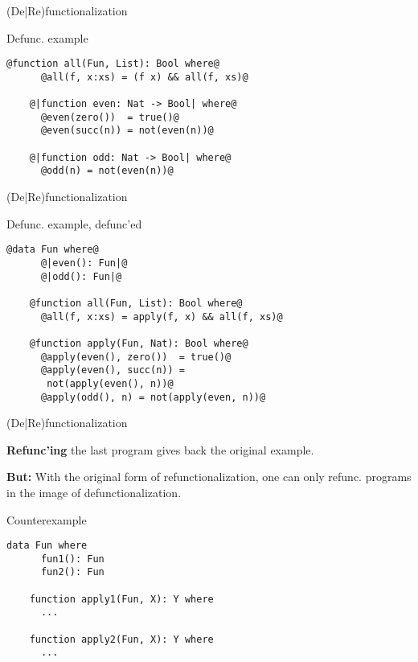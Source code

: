 \documentclass[xcolor=svgnames]{beamer}
\begin{document}
\begin{frame}[fragile]
  {(De|Re)functionalization}

  \begin{block}{Defunc. example}
    \begin{lstlisting}[style=base, gobble=4]
    @function all(Fun, List): Bool where@
      @all(f, x:xs) = (f x) && all(f, xs)@

    @|function even: Nat -> Bool| where@
      @even(zero())  = true()@
      @even(succ(n)) = not(even(n))@

    @|function odd: Nat -> Bool| where@
      @odd(n) = not(even(n))@
    \end{lstlisting}
  \end{block}
  \pause
\end{frame}

\begin{frame}[fragile]
  {(De|Re)functionalization}

  \begin{block}{Defunc. example, defunc'ed}
    \begin{lstlisting}[style=base, gobble=4]
    @data Fun where@
      @|even(): Fun|@
      @|odd(): Fun|@

    @function all(Fun, List): Bool where@
      @all(f, x:xs) = apply(f, x) && all(f, xs)@

    @function apply(Fun, Nat): Bool where@
      @apply(even(), zero())  = true()@
      @apply(even(), succ(n)) = 
       not(apply(even(), n))@
      @apply(odd(), n) = not(apply(even, n))@
    \end{lstlisting}
  \end{block}
  \pause
\end{frame}

\begin{frame}[fragile]
  {(De|Re)functionalization}

  \textbf{Refunc'ing} the last program gives back the original example.

  \textbf{But:} With the original form of refunctionalization, one can only refunc. programs in the image of defunctionalization.

  \begin{block}{Counterexample}
    \begin{lstlisting}[escapechar=!]
    data Fun where
      fun1(): Fun
      fun2(): Fun

    function apply1(Fun, X): Y where
      ...
    
    function apply2(Fun, X): Y where
      ...
    \end{lstlisting}
  \end{block}
\end{frame}
\end{document}
